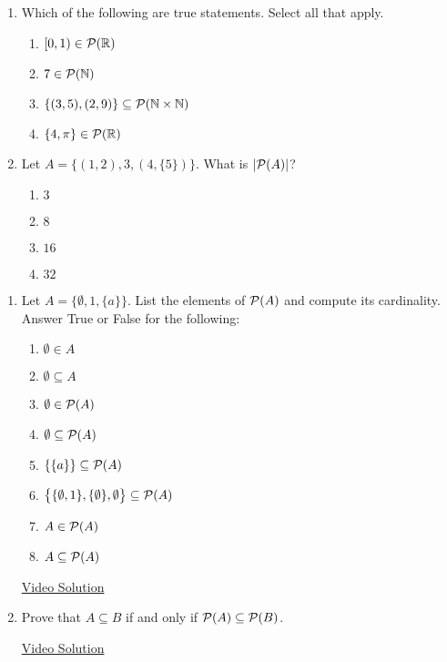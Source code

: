 \pagestyle{empty}


\begin{enumerate}
  \item Which of the following are true statements. Select all that apply.
  \begin{enumerate}
    \item $[0,1)\in\mathcal{P}(\mathbb{R})$
    \item $7\in\mathcal{P}(\mathbb{N})$
    \item $\{(3,5),(2,9)\} \subseteq \mathcal{P}(\mathbb{N} \times \mathbb{N})$
    \item $\{4,\pi\} \in \mathcal{P}(\mathbb{R})$
  \end{enumerate}
    
  \item Let $A=\bigl\{(1,2),3,(4,\{5\})\bigr\}$. What is $\left| \mathcal{P}(A)\right|$?
  \begin{enumerate}
    \item $3$
    \item $8$
    \item $16$
    \item $32$
  \end{enumerate}
\end{enumerate}



\begin{enumerate}
	\item Let $A= \bigl\{\emptyset, 1, \{a\}\bigr\}$. List the elements of $\mathcal{P}(A)$ and compute its cardinality. Answer True or False for the following:
	\begin{enumerate}
    \item $\emptyset \in A$
    \item $\emptyset \subseteq A$
    \item $\emptyset \in \mathcal{P}(A)$
    \item $\emptyset \subseteq \mathcal{P}(A)$
    \item $\{\{a\}\} \subseteq \mathcal{P}(A)$
    \item $\bigl\{\{\emptyset, 1\}, \{\emptyset\}, \emptyset\bigr\} \subseteq \mathcal{P}(A)$
    \item $A \in \mathcal{P}(A)$
    \item $A \subseteq \mathcal{P}(A)$
	\end{enumerate}

	\href{https://youtu.be/Pprf24H6SLc}{Video Solution}

	\item Prove that $A\subseteq B$ if and only if $\mathcal{P}(A)\subseteq \mathcal{P}(B)$. 

	\href{https://youtu.be/24tLpM3qdMM}{Video Solution}
\end{enumerate}

